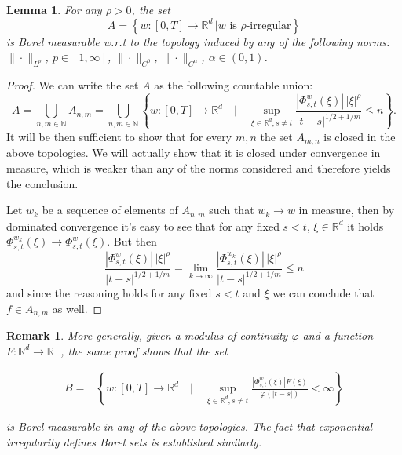 \documentclass[10pt]{article}
\newtheorem{lemma}[theorem]{Lemma}
\newtheorem{remark}[theorem]{Remark}
\begin{document}
\begin{lemma}
  \label{sec2.2 lemma borel rho irr}For any $\rho > 0$, the set
  \begin{equation*}
    A = \left\{ w : [0, T] \rightarrow \mathbb{R}^d \, | \text{$w$ is
    $\rho$-irregular} \right\}
  \end{equation*}
  is Borel measurable w.r.t to the topology induced by any of the following
  norms: $\| \cdot \|_{L^p}$, $p \in [1, \infty]$, $\| \cdot \|_{C^0}$, $\|
  \cdot \|_{C^{\alpha}}$, $\alpha \in (0, 1)$.
\end{lemma}

\begin{proof}
  We can write the set $A$ as the following countable union:
  \begin{equation*}
    A = \bigcup_{n, m \in \mathbb{N}} A_{n, m} = \bigcup_{n, m \in
    \mathbb{N}} \left\{ w : [0, T] \rightarrow \mathbb{R}^d \hspace{1em} |
    \hspace{1em} \sup_{\xi \in \mathbb{R}^d, s \neq t} \frac{| \Phi^w_{s, t}
    (\xi) | \, | \xi |^{\rho}}{| t - s |^{1 / 2 + 1 / m}} \leqslant n \right\}
    .
  \end{equation*}
  It will be then sufficient to show that for every $m, n$ the set $A_{m, n}$
  is closed in the above topologies. We will actually show that it is closed
  under convergence in measure, which is weaker than any of the norms
  considered and therefore yields the conclusion.
  
  Let $w_k$ be a sequence of elements of $A_{n, m}$ such that $w_k \rightarrow
  w$ in measure, then by dominated convergence it's easy to see that for any
  fixed $s < t$, $\xi \in \mathbb{R}^d$ it holds $\Phi^{w_k}_{s, t} (\xi)
  \rightarrow \Phi^w_{s, t} (\xi)$. But then
  \begin{equation*}
    \frac{| \Phi^w_{s, t} (\xi) | \, | \xi |^{\rho}}{| t - s |^{1 / 2 + 1/m}}
    = \lim_{k \rightarrow \infty} \frac{| \Phi^{w_k}_{s, t} (\xi) | \, |
    \xi |^{\rho}}{| t - s |^{1 / 2 + 1 / m}} \leqslant n \nonumber
  \end{equation*}
  and since the reasoning holds for any fixed $s<t$ and $\xi$ we can
  conclude that $f \in A_{n, m}$ as well.
\end{proof}

\begin{remark}
  \label{sec2.2 lemma borel general}More generally, given a modulus of
  continuity $\varphi$ and a function $F : \mathbb{R}^d \rightarrow
  \mathbb{R}^+$, the same proof shows that the set
  
  \begin{align}
    B = & \left\{ w : [0, T] \rightarrow \mathbb{R}^d \hspace{1em} |
    \hspace{1em} \sup_{\xi \in \mathbb{R}^d, s \neq t} \frac{| \Phi^w_{s, t}
    (\xi) | F (\xi)}{\varphi (| t - s |)} < \infty \right\} \nonumber
  \end{align}
  
  is Borel measurable in any of the above topologies. The fact that
  exponential irregularity defines Borel sets is established similarly.
\end{remark}
\end{document}
